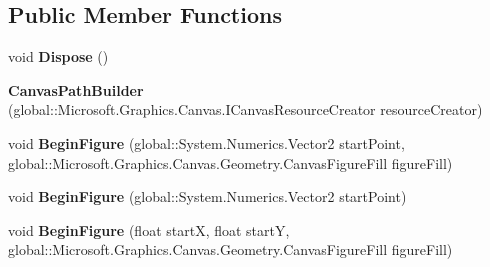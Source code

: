 \subsection*{Public Member Functions}
\begin{DoxyCompactItemize}
\item 
\mbox{\label{class_microsoft_1_1_graphics_1_1_canvas_1_1_geometry_1_1_canvas_path_builder_a89be25e209b666fcd806f7e81cf7b139}} 
void {\bfseries Dispose} ()
\item 
\mbox{\label{class_microsoft_1_1_graphics_1_1_canvas_1_1_geometry_1_1_canvas_path_builder_a670ec4a87a7f5f8c9ee492317da23aa3}} 
{\bfseries Canvas\+Path\+Builder} (global\+::\+Microsoft.\+Graphics.\+Canvas.\+I\+Canvas\+Resource\+Creator resource\+Creator)
\item 
\mbox{\label{class_microsoft_1_1_graphics_1_1_canvas_1_1_geometry_1_1_canvas_path_builder_af7a65d1c4ea84486b8567a452abaaa82}} 
void {\bfseries Begin\+Figure} (global\+::\+System.\+Numerics.\+Vector2 start\+Point, global\+::\+Microsoft.\+Graphics.\+Canvas.\+Geometry.\+Canvas\+Figure\+Fill figure\+Fill)
\item 
\mbox{\label{class_microsoft_1_1_graphics_1_1_canvas_1_1_geometry_1_1_canvas_path_builder_a58b72d59626692a590f9613507b1613d}} 
void {\bfseries Begin\+Figure} (global\+::\+System.\+Numerics.\+Vector2 start\+Point)
\item 
\mbox{\label{class_microsoft_1_1_graphics_1_1_canvas_1_1_geometry_1_1_canvas_path_builder_a13ecf54f872f85460fbe3ea214d7b143}} 
void {\bfseries Begin\+Figure} (float startX, float startY, global\+::\+Microsoft.\+Graphics.\+Canvas.\+Geometry.\+Canvas\+Figure\+Fill figure\+Fill)
\item 
\mbox{\label{class_microsoft_1_1_graphics_1_1_canvas_1_1_geometry_1_1_canvas_path_builder_accd5484b3a6afe779cc05b671ceab2d6}} 

\end{DoxyCompactItemize}
